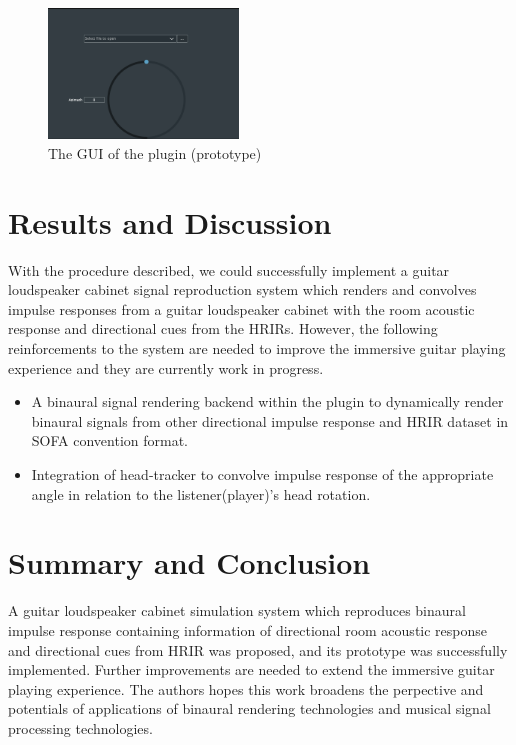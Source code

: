 \documentclass[convention,e-brief]{aesconf-current}
\begin{document}
\begin{figure}
    \centering
    \includegraphics[width=0.45\textwidth]{./fig/gui.png}
    \caption{The GUI of the plugin (prototype)}
    \label{fig:gui}
\end{figure}

\section{Results and Discussion}
With the procedure described, we could successfully implement a guitar loudspeaker cabinet signal reproduction system which renders and convolves impulse responses from a guitar loudspeaker cabinet with the room acoustic response and directional cues from the HRIRs.
However, the following reinforcements to the system are needed to improve the immersive guitar playing experience and they are currently work in progress.

\begin{itemize}
    \item A binaural signal rendering backend within the plugin to dynamically render binaural signals from other directional impulse response and HRIR dataset in SOFA convention format.
    \item Integration of head-tracker to convolve impulse response of the appropriate angle in relation to the listener(player)'s head rotation.
\end{itemize}

\section{Summary and Conclusion}

A guitar loudspeaker cabinet simulation system which reproduces binaural impulse response containing information of directional room acoustic response and directional cues from HRIR was proposed, and its prototype was successfully implemented.
Further improvements are needed to extend the immersive guitar playing experience.
The authors hopes this work broadens the perpective and potentials of applications of binaural rendering technologies and musical signal processing technologies.





\end{document}

